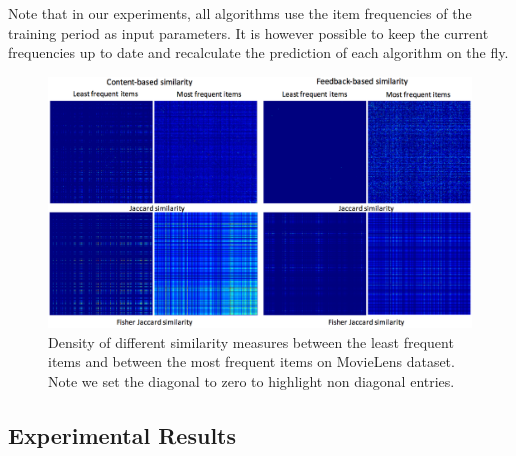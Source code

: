 \documentclass[preprint]{sig-alternate-05-2015}
\begin{document}
Note that in our experiments, all algorithms use the item frequencies of the training period as input parameters.
It is however possible to keep the current frequencies up to date and recalculate the prediction of each algorithm on the fly.

\begin{figure}
\centerline{
  \includegraphics[scale=.21]{Sparsity.png}}
\caption[]{Density of different similarity measures between the least frequent items and between the most frequent items on MovieLens dataset. Note we set the diagonal to zero to highlight non diagonal entries.}
\label{fig:sparsity}
\end{figure}


\subsection{Experimental Results}
\end{document}
